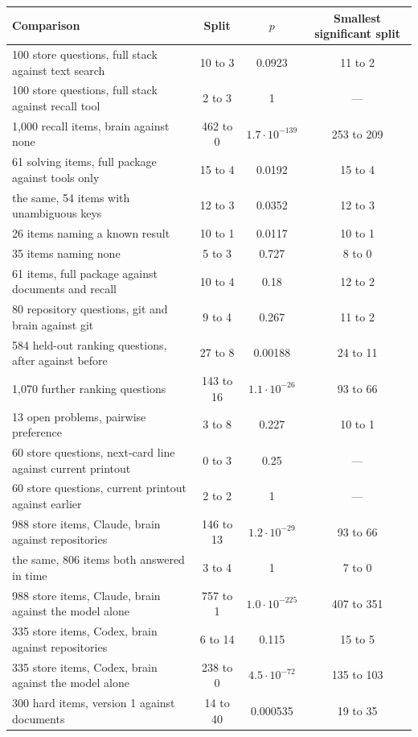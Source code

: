 \begin{table}[ht]
\centering\small
\begin{tabular}{p{6.3cm}ccc}
\toprule
Comparison & Split & $p$& Smallest significant split\\
\midrule
100 store questions, full stack against text search & 10 to 3 & 0.0923 & 11 to 2\\
100 store questions, full stack against recall tool & 2 to 3 & 1 & ---\\
1{,}000 recall items, brain against none & 462 to 0 & $1.7\cdot10^{-139}$ & 253 to 209\\
61 solving items, full package against tools only & 15 to 4 & 0.0192 & 15 to 4\\
the same, 54 items with unambiguous keys & 12 to 3 & 0.0352 & 12 to 3\\
26 items naming a known result & 10 to 1 & 0.0117 & 10 to 1\\
35 items naming none & 5 to 3 & 0.727 & 8 to 0\\
61 items, full package against documents and recall & 10 to 4 & 0.18 & 12 to 2\\
80 repository questions, git and brain against git & 9 to 4 & 0.267 & 11 to 2\\
584 held-out ranking questions, after against before & 27 to 8 & 0.00188 & 24 to 11\\
1{,}070 further ranking questions & 143 to 16 & $1.1\cdot10^{-26}$ & 93 to 66\\
13 open problems, pairwise preference & 3 to 8 & 0.227 & 10 to 1\\
60 store questions, next-card line against current printout & 0 to 3 & 0.25 & ---\\
60 store questions, current printout against earlier & 2 to 2 & 1 & ---\\
988 store items, Claude, brain against repositories & 146 to 13 & $1.2\cdot10^{-29}$ & 93 to 66\\
the same, 806 items both answered in time & 3 to 4 & 1 & 7 to 0\\
988 store items, Claude, brain against the model alone & 757 to 1 & $1.0\cdot10^{-225}$ & 407 to 351\\
335 store items, Codex, brain against repositories & 6 to 14 & 0.115 & 15 to 5\\
335 store items, Codex, brain against the model alone & 238 to 0 & $4.5\cdot10^{-72}$ & 135 to 103\\
300 hard items, version 1 against documents & 14 to 40 & 0.000535 & 19 to 35\\

\end{tabular}
\end{table}
